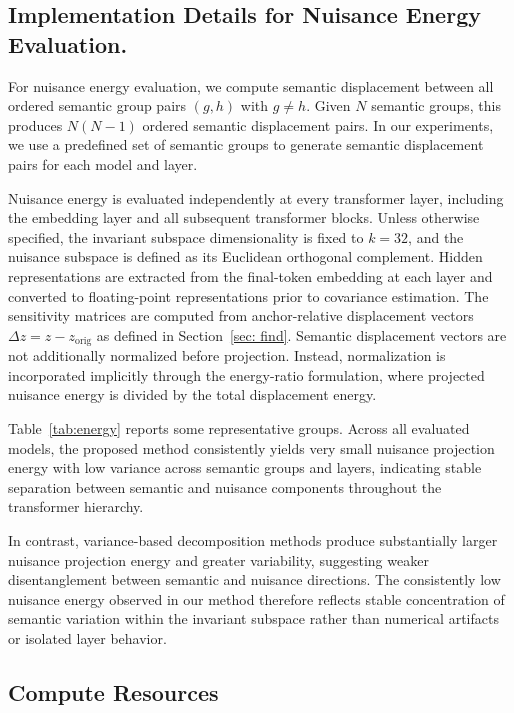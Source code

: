 \subsection{Implementation Details for Nuisance Energy Evaluation.}
For nuisance energy evaluation, we compute semantic displacement between all ordered semantic group pairs $(g,h)$ with $g \neq h$. Given $N$ semantic groups, this produces $N(N-1)$ ordered semantic displacement pairs. In our experiments, we use a predefined set of semantic groups to generate semantic displacement pairs for each model and layer.

Nuisance energy is evaluated independently at every transformer layer, including the embedding layer and all subsequent transformer blocks. Unless otherwise specified, the invariant subspace dimensionality is fixed to $k=32$, and the nuisance subspace is defined as its Euclidean orthogonal complement.
Hidden representations are extracted from the final-token embedding at each layer and converted to floating-point representations prior to covariance estimation. 
The sensitivity matrices are computed from anchor-relative displacement vectors $\Delta z=z-z_{\mathrm{orig}}$ as defined in Section~\ref{sec: find}. 
Semantic displacement vectors are not additionally normalized before projection. Instead, normalization is incorporated implicitly through the energy-ratio formulation, where projected nuisance energy is divided by the total displacement energy.

Table~\ref{tab:energy} reports some representative groups. Across all evaluated models, the proposed method consistently yields very small nuisance projection energy with low variance across semantic groups and layers, indicating stable separation between semantic and nuisance components throughout the transformer hierarchy.

In contrast, variance-based decomposition methods produce substantially larger nuisance projection energy and greater variability, suggesting weaker disentanglement between semantic and nuisance directions. The consistently low nuisance energy observed in our method therefore reflects stable concentration of semantic variation within the invariant subspace rather than numerical artifacts or isolated layer behavior.

\subsection{Compute Resources}
\label{app:compute_resources}

